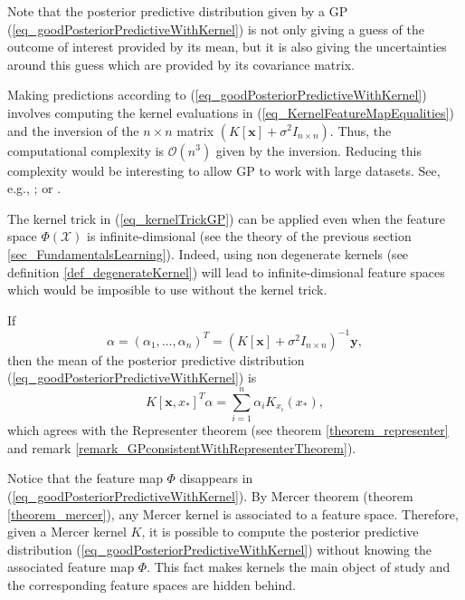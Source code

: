 \begin{remark} \label{remark_GPalsoGivesUncertainties}
  Note that the posterior predictive distribution given by a GP (\ref{eq_goodPosteriorPredictiveWithKernel}) is not only giving a guess of the outcome of interest provided by its mean, but it is also giving the uncertainties around this guess which are provided by its covariance matrix.
\end{remark} 

\begin{remark} \label{remark_GPandKernelTrick}
  Making predictions according to (\ref{eq_goodPosteriorPredictiveWithKernel}) involves computing the kernel evaluations in (\ref{eq_KernelFeatureMapEqualities}) and the inversion of the $n \times n$ matrix $\left( K[\pmb{x}] + \sigma^2 I_{n \times n} \right)$. Thus, the computational complexity is $\mathcal{O}(n^3)$ given by the inversion. Reducing this complexity would be interesting to allow GP to work with large datasets. See, e.g., \textcite{hensman2013}; \textcite{liu2020} or \textcite{gal2014}.
\end{remark} 

\begin{remark} \label{remark_kernelTrickEvenInfinitePhi}
  The kernel trick in (\ref{eq_kernelTrickGP}) can be applied even when the feature space $\Phi(\mathcal{X})$ is infinite\hyp{}dimsional (see the theory of the previous section \ref{sec_FundamentalsLearning}). Indeed, using non degenerate kernels (see definition \ref{def_degenerateKernel}) will lead to infinite\hyp{}dimsional feature spaces which would be imposible to use without the kernel trick. 
\end{remark}

\begin{remark} \label{remark_GPfollowsRepresenterTheorem}
  If
  \begin{equation*}
    \alpha = (\alpha_1, \dots, \alpha_n)^T = \left( K[\pmb{x}] + \sigma^2 I_{n \times n} \right)^{-1}\pmb{y},
  \end{equation*}
  then the mean of the posterior predictive distribution (\ref{eq_goodPosteriorPredictiveWithKernel}) is
  $$
    K[\pmb{x},x_*]^T \alpha = \sum_{i=1}^n \alpha_i K_{x_i}(x_*), 
  $$
  which agrees with the Representer theorem (see theorem \ref{theorem_representer} and remark \ref{remark_GPconsistentWithRepresenterTheorem}).
\end{remark}

\begin{remark} \label{remark_phiNotNeedKnown}
  Notice that the feature map $\Phi$ disappears in (\ref{eq_goodPosteriorPredictiveWithKernel}). By Mercer theorem (theorem \ref{theorem_mercer}), any Mercer kernel is associated to a feature space. Therefore, given a Mercer kernel $K$, it is possible to compute the posterior predictive distribution (\ref{eq_goodPosteriorPredictiveWithKernel}) without knowing the associated feature map $\Phi$. This fact makes kernels the main object of study and the corresponding feature spaces are hidden behind.  
\end{remark}

